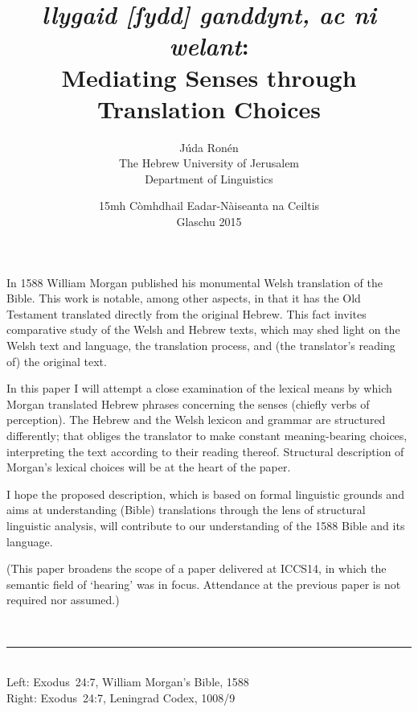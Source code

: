 
\title{\vspace{-1cm}
	{
		\Large
		\emph{llygaid [ſydd] ganddynt, ac ni welant}:\\
		Mediating Senses through Translation Choices
	}
}
\author{%
	\normalsize Júda Ronén\\[-0.1em]
	\small The Hebrew University of Jerusalem\\[-0.1em]
	\small Department of Linguistics
}
\date{
	\normalsize 15mh Còmhdhail Eadar-Nàiseanta na Ceiltis\\
	\normalsize Glaschu 2015
}
\maketitle
\thispagestyle{empty}


\vspace{-0.5cm}
{\small
\noindent
In 1588 William Morgan published his monumental Welsh translation of the Bible. This work is notable, among other aspects, in that it has the Old Testament translated directly from the original Hebrew. This fact invites comparative study of the Welsh and Hebrew texts, which may shed light on the Welsh text and language, the translation process, and (the translator’s reading of) the original text.

In this paper I will attempt a close examination of the lexical means by which Morgan translated Hebrew phrases concerning the senses (chiefly verbs of perception). The Hebrew and the Welsh lexicon and grammar are structured differently; that obliges the translator to make constant meaning-bearing choices, interpreting the text according to their reading thereof. Structural description of Morgan’s lexical choices will be at the heart of the paper.

I hope the proposed description, which is based on formal linguistic grounds and aims at understanding (Bible) translations through the lens of structural linguistic analysis, will contribute to our understanding of the 1588 Bible and its language.

(This paper broadens the scope of a paper delivered at ICCS14, in which the semantic field of ‘hearing’ was in focus. Attendance at the previous paper is not required nor assumed.)
}

~

\hrule

\vfill

\begin{center}
	\hfill
	\\
	Left: Exodus~24:7, William Morgan's Bible, 1588\\
	Right: Exodus~24:7, Leningrad Codex, 1008/9
\end{center}

